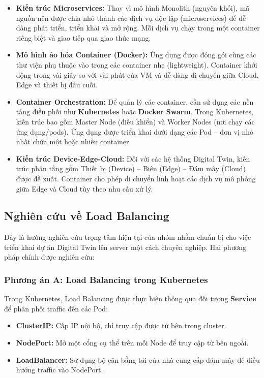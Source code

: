 \documentclass[twocolumn]{article}
\begin{document}
\begin{itemize}
	\item \textbf{Kiến trúc Microservices:} Thay vì mô hình Monolith (nguyên khối), mã nguồn nên được chia nhỏ thành các dịch vụ độc lập (microservices) để dễ dàng phát triển, triển khai và mở rộng. Mỗi dịch vụ chạy trong một container riêng biệt và giao tiếp qua giao thức mạng.

	\item \textbf{Mô hình ảo hóa Container (Docker):} Ứng dụng được đóng gói cùng các thư viện phụ thuộc vào trong các container nhẹ (lightweight). Container khởi động trong vài giây so với vài phút của VM và dễ dàng di chuyển giữa Cloud, Edge và thiết bị đầu cuối.

	\item \textbf{Container Orchestration:} Để quản lý các container, cần sử dụng các nền tảng điều phối như \textbf{Kubernetes} hoặc \textbf{Docker Swarm}. Trong Kubernetes, kiến trúc bao gồm Master Node (điều khiển) và Worker Nodes (nơi chạy các ứng dụng/pods). Ứng dụng được triển khai dưới dạng các Pod -- đơn vị nhỏ nhất chứa một hoặc nhiều container.

	\item \textbf{Kiến trúc Device-Edge-Cloud:} Đối với các hệ thống Digital Twin, kiến trúc phân tầng gồm Thiết bị (Device) -- Biên (Edge) -- Đám mây (Cloud) được đề xuất. Container cho phép di chuyển linh hoạt các dịch vụ mô phỏng giữa Edge và Cloud tùy theo nhu cầu xử lý.
\end{itemize}

\subsection{Nghiên cứu về Load Balancing}
Đây là hướng nghiên cứu trọng tâm hiện tại của nhóm nhằm chuẩn bị cho việc triển khai dự án Digital Twin lên server một cách chuyên nghiệp. Hai phương pháp chính được nghiên cứu:

\subsubsection{Phương án A: Load Balancing trong Kubernetes}
Trong Kubernetes, Load Balancing được thực hiện thông qua đối tượng \textbf{Service} để phân phối traffic đến các Pod:

\begin{itemize}[noitemsep]
	\item \textbf{ClusterIP:} Cấp IP nội bộ, chỉ truy cập được từ bên trong cluster.
	\item \textbf{NodePort:} Mở một cổng cụ thể trên mỗi Node để truy cập từ bên ngoài.
	\item \textbf{LoadBalancer:} Sử dụng bộ cân bằng tải của nhà cung cấp đám mây để điều hướng traffic vào NodePort.
\end{itemize}
\end{document}
